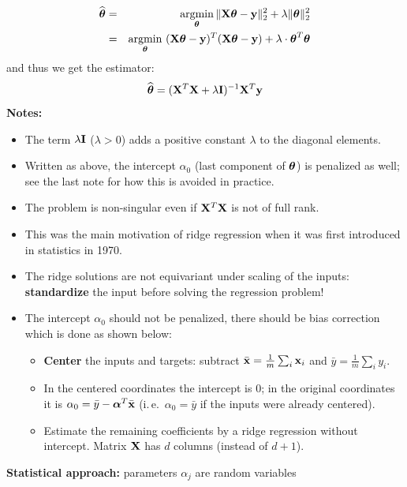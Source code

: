 	\begin{eqnarray*}
		\widehat{\bm{\mathrm{\theta}}}
		&=& \operatorname*{argmin}_{\bm{\mathrm{\theta}}} \| \mathbf{X} \bm{\mathrm{\theta}} - \bm{\mathrm{y}} \|^2_2 + \lambda \|\bm{\mathrm{\theta}}\|^2_2 \\ 
		&=& \operatorname*{argmin}_{\bm{\mathrm{\theta}}} \ (\mathbf{X} \bm{\mathrm{\theta}} - \bm{\mathrm{y}})^T (\mathbf{X} \bm{\mathrm{\theta}}-\bm{\mathrm{y}}) +
		\lambda \cdot \bm{\mathrm{\theta}}^T\bm{\mathrm{\theta}}
	\end{eqnarray*}
	and thus we get the estimator:
	\begin{displaymath}
		\widehat{\bm{\mathrm{\theta}}} = (\mathbf{X}^T\mathbf{X}+\lambda \mathbf{I})^{-1}\mathbf{X}^T\bm{\mathrm{y}}
	\end{displaymath}
	\textbf{Notes:}
	\begin{itemize}
		\item The term $\lambda \mathbf{I}$ ($\lambda>0$) adds a positive constant $\lambda$ to the diagonal elements.
		\item Written as above, the intercept $\alpha_0$ (last component of $\bm{\mathrm{\theta}}$) is penalized as well; see the last note for how this is avoided in practice.
		\item The problem is non-singular even if $\mathbf{X}^T \mathbf{X}$ is not of full rank. 
		\item This was the main motivation of ridge regression when it was first introduced in statistics in 1970.
		\item The ridge solutions are not equivariant under scaling of the inputs: 
		      \textbf{standardize} the input before solving the regression problem!  
		\item The intercept $\alpha_0$ should not be penalized, there should be bias correction which is done as shown below:
		      \begin{itemize}
			      \item \textbf{Center} the inputs and targets: subtract $\bar{\bm{\mathrm{x}}}=\frac1m\sum_i\bm{\mathrm{x}}_i$ and $\bar y=\frac1m\sum_i y_i$.
			      \item In the centered coordinates the intercept is $0$; in the original coordinates it is $\alpha_0=\bar y-\bm{\mathrm{\alpha}}^T\bar{\bm{\mathrm{x}}}$ (i.\,e.\ $\alpha_0=\bar y$ if the inputs were already centered).
			      \item Estimate the remaining coefficients by a ridge regression without  intercept. Matrix $\mathbf{X}$ has $d$ columns (instead of $d+1$).
		      \end{itemize}
	\end{itemize}
\textbf{Statistical approach:} parameters $\alpha_j$ are random variables 
